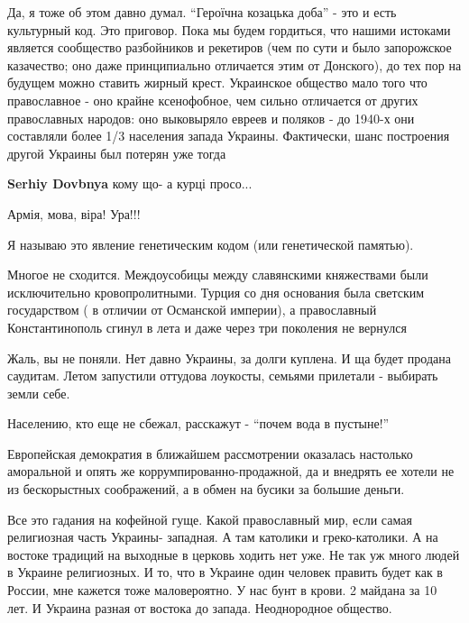  
 
 
 
 
\zzSecCmt

\begin{itemize} %

Да, я тоже об этом давно думал. \enquote{Героїчна козацька доба} - это и есть
культурный код. Это приговор. Пока мы будем гордиться, что нашими истоками
является сообщество разбойников и рекетиров (чем по сути и было запорожское
казачество; оно даже принципиально отличается этим от Донского), до тех пор на
будущем можно ставить жирный крест. Украинское общество мало того что
православное - оно крайне ксенофобное, чем сильно отличается от других
православных народов: оно выковыряло евреев и поляков - до 1940-х они
составляли более 1/3 населения запада Украины. Фактически, шанс построения другой
Украины был потерян уже тогда

\begin{itemize} %
\textbf{Serhiy Dovbnya} кому що- а курці просо...

Армія, мова, віра! Ура!!!
\end{itemize} %

Я называю это явление генетическим кодом (или генетической памятью).


Многое не сходится. Междоусобицы между славянскими княжествами были
исключительно кровопролитными. Турция со дня основания была светским
государством ( в отличии от Османской империи), а православный Константинополь
сгинул в лета и даже через три поколения не вернулся



Жаль, вы не поняли. Нет давно Украины, за долги куплена. И ща будет продана
саудитам. Летом запустили оттудова лоукосты, семьями прилетали - выбирать земли
себе.

Населению, кто еще не сбежал, расскажут - \enquote{почем вода в пустыне!}


Европейская демократия в ближайшем рассмотрении оказалась настолько аморальной
и опять же коррумпированно-продажной, да и внедрять ее хотели не из
бескорыстных соображений, а в обмен на бусики за большие деньги.



Все это гадания на кофейной гуще. Какой православный мир, если самая
религиозная часть Украины- западная. А там католики и греко-католики. А на
востоке традиций на выходные в церковь ходить нет уже. Не так уж много людей в
Украине религиозных. И то, что в Украине один человек править будет как в
России, мне кажется тоже маловероятно. У нас бунт в крови. 2 майдана за 10
лет. И Украина разная от востока до запада. Неоднородное общество.

\end{itemize} %
